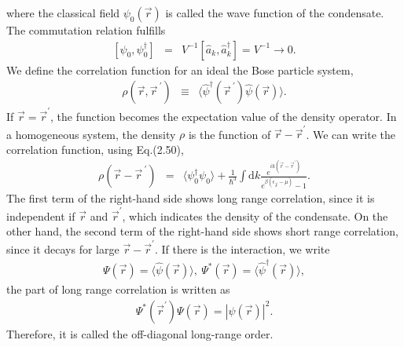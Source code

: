 \documentclass[12pt,a4paper]{report}
\newcommand{\diff}{\mathrm{d}}				            %
\begin{document}
where the classical field $\psi_0 ( \vec{r} )$ is called the wave function of the condensate.
The commutation relation fulfills 
\begin{eqnarray}
\left[ \psi_0, \psi^\dagger_0 \right] & = & V^{-1} \left[ \hat{a}_k, \hat{a}^\dagger_k \right]
= V^{-1} \rightarrow 0.
\end{eqnarray}
We define the correlation function for an ideal the Bose particle system,
\begin{eqnarray}
\rho( \vec{r}, \vec{r}^{\ \prime} ) & \equiv & \langle \hat{\psi}^\dagger(\vec{r}^{\ \prime}) \hat{\psi}( \vec{r} ) \rangle.
\end{eqnarray}
If $\vec{r} = \vec{r}^\prime$, the function becomes the expectation value of the density operator.
In a homogeneous system, the density $\rho$ is the function of $\vec{r} - \vec{r}^\prime$.
We can write the correlation function, using Eq.(2.50),
\begin{eqnarray}
\rho( \vec{r} - \vec{r}^{\ \prime} ) & = & \langle \psi^\dagger_0 \psi_0 \rangle
+ \frac{1}{\hbar^3} \int \diff k \frac{e^{i k  (\vec{r} - \vec{r}^{\prime})}}
{e^{\beta (\epsilon_{\vec{k}} - \mu)} - 1}.
\end{eqnarray}
The first term of the right-hand side shows long range correlation, since
it is independent if $\vec{r}$ and $\vec{r}^\prime$, which indicates the density of the condensate.
On the other hand, the second term of the right-hand side shows short range correlation,
since it decays for large $\vec{r} - \vec{r}^\prime$.
If there is the interaction, we write
\begin{eqnarray}
\varPsi( \vec{r} ) = \langle \hat{\psi}(\vec{r}) \rangle, \ \varPsi^*( \vec{r} ) = \langle \hat{\psi}^\dagger(\vec{r}) \rangle,
\end{eqnarray}
the part of long range correlation is written %
as
\begin{eqnarray}
\varPsi^*(\vec{r}^\prime) \varPsi(\vec{r}) = |\psi(\vec{r})|^2.
\end{eqnarray}
Therefore, it is called the off-diagonal long-range order.
\end{document}
